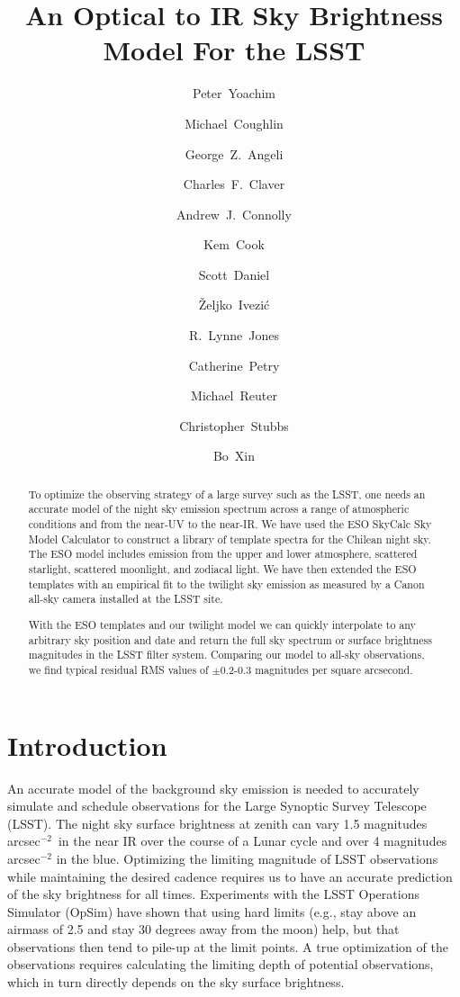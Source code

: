 \documentclass[]{spie}
\title{An Optical to IR Sky Brightness Model For the LSST}
\author[a]{Peter~Yoachim}
\author[b]{Michael~Coughlin}
\author[c]{George~Z.~Angeli }
\author[c]{Charles~F.~Claver }
\author[a]{Andrew~J.~Connolly}
\author[d]{Kem~Cook}
\author[a]{Scott~Daniel}
\author[a]{\v{Z}eljko~Ivezi\'{c}}
\author[a]{R.~Lynne~Jones}
\author[c]{Catherine~Petry}
\author[c]{Michael~Reuter}
\author[b]{Christopher~Stubbs}
\author[c]{Bo~Xin}
\affil[a]{University of Washington, Seattle, WA, USA}
\affil[b]{Harvard University, Boston, MA, USA}
\affil[c]{LSST Project Office, Tucson, AZ, USA}
\affil[d]{Cook Astronomical Consulting, CA, USA}
\begin{document}
\maketitle

\begin{abstract}
  To optimize the observing strategy of a large survey such as the LSST, one needs an accurate model of the night sky emission spectrum across a range of atmospheric conditions and from the near-UV to the near-IR.  We have used the ESO SkyCalc Sky Model Calculator \cite{Noll12,Jones13} to construct a library of template spectra for the Chilean night sky.  The ESO model includes emission from the upper and lower atmosphere, scattered starlight, scattered moonlight, and zodiacal light.
  We have then extended the ESO templates with an empirical fit to the twilight sky emission as measured by a Canon all-sky camera installed at the LSST site.

  With the ESO templates and our twilight model we can quickly interpolate to any arbitrary sky position and date and return the full sky spectrum or surface brightness magnitudes in the LSST filter system. Comparing our model to all-sky observations, we find typical residual RMS values of $\pm$0.2-0.3 magnitudes per square arcsecond.
\end{abstract}


\section{Introduction}

An accurate model of the background sky emission is needed to accurately simulate and schedule observations for the Large Synoptic Survey Telescope (LSST)\cite{Kahn16}.  The night sky surface brightness at zenith can vary 1.5 magnitudes arcsec$^{-2}$\ in the near IR over the course of a Lunar cycle and over 4 magnitudes arcsec$^{-2}$ in the blue.  Optimizing the limiting magnitude of LSST observations while maintaining the desired cadence requires us to have an accurate prediction of the sky brightness for all times.  Experiments with the LSST Operations Simulator (OpSim) \cite{Delgado14} have shown that using hard limits (e.g., stay above an airmass of 2.5 and stay 30 degrees away from the moon) help, but that observations then tend to pile-up at the limit points.  A true optimization of the observations requires calculating the limiting depth of potential observations, which in turn directly depends on the sky surface brightness.
\end{document}
